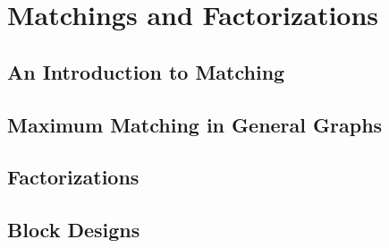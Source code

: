 \chapter{Matchings and Factorizations}
\section{An Introduction to Matching}
\setcounter{section}{3}
\section{Maximum Matching in General Graphs}
\section{Factorizations}
\section{Block Designs}




